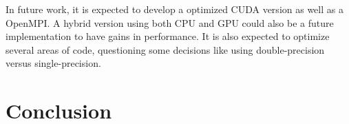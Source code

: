 \documentclass[a4paper,10pt,openright,openbib,twocolumn]{article}
\begin{document}
In future work, it is expected to develop a optimized CUDA version as well as a OpenMPI. A hybrid version using both CPU and GPU could also be a future implementation to have gains in performance. It is also expected to optimize several areas of code, questioning some decisions like using double-precision versus single-precision. 

\section{Conclusion}

\end{document}
